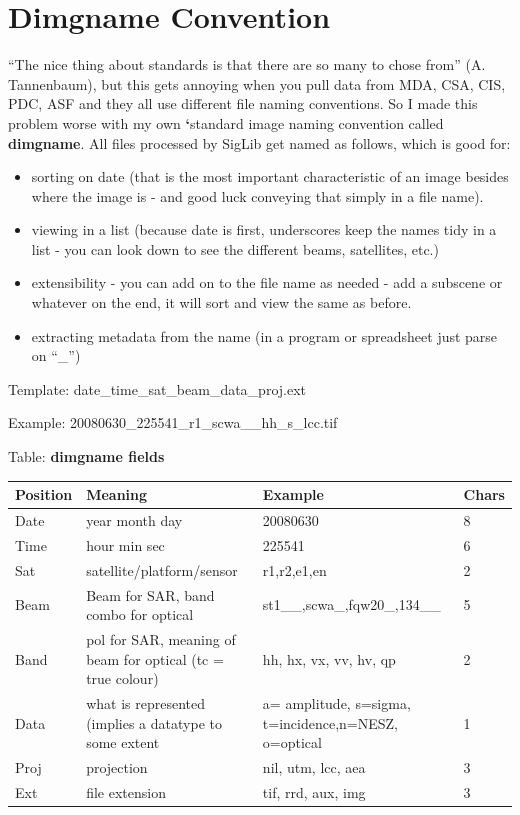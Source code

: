 \documentclass[letterpaper,10pt,openany,oneside]{sphinxmanual}
\begin{document}
\section{Dimgname Convention}
\label{project:dimgname-convention}
“The nice thing about standards is that there are so many to chose from”
(A. Tannenbaum), but this gets annoying when you pull data from MDA,
CSA, CIS, PDC, ASF and they all use different file naming conventions.
So I made this problem worse with my own {\color{red}\bfseries{}{}`}standard image naming
convention called \textbf{dimgname}. All files
processed by SigLib get named as follows, which is good for:
\begin{itemize}
\item {} 
sorting on date (that is the most important characteristic of an
image besides where the image is - and good luck conveying that
simply in a file name).

\item {} 
viewing in a list (because date is first, underscores keep the names
tidy in a list - you can look down to see the different beams,
satellites, etc.)

\item {} 
extensibility - you can add on to the file name as needed - add a
subscene or whatever on the end, it will sort and view the same as
before.

\item {} 
extracting metadata from the name (in a program or spreadsheet just
parse on ``\_'')

\end{itemize}

Template: date\_time\_sat\_beam\_data\_proj.ext

Example: 20080630\_225541\_r1\_scwa\_\_hh\_s\_lcc.tif

Table: \textbf{dimgname fields}

\begin{tabulary}{\linewidth}{|L|L|L|L|}
\hline
\textsf{\relax 
Position
} & \textsf{\relax 
Meaning
} & \textsf{\relax 
Example
} & \textsf{\relax 
Chars
}\\
\hline
\textbar{} Date
 & 
year month day
 & 
20080630
 & 
8
\\
\hline
\textbar{} Time
 & 
hour min sec
 & 
225541
 & 
6
\\
\hline
\textbar{} Sat
 & 
satellite/platform/sensor
 & 
r1,r2,e1,en
 & 
2
\\
\hline
\textbar{} Beam
 & 
Beam for SAR, band combo for optical
 & 
st1\_\_,scwa\_,fqw20\_,134\_\_
 & 
5
\\
\hline
\textbar{} Band
 & 
pol for SAR, meaning of beam for optical (tc = true colour)
 & 
hh, hx, vx, vv, hv, qp
 & 
2
\\
\hline
\textbar{} Data
 & 
what is represented (implies a datatype to some extent
 & 
a= amplitude, s=sigma, t=incidence,n=NESZ, o=optical
 & 
1
\\
\hline
\textbar{} Proj
 & 
projection
 & 
nil, utm, lcc, aea
 & 
3
\\
\hline
\textbar{} Ext
 & 
file extension
 & 
tif, rrd, aux, img
 & 
3
\\
\hline\end{tabulary}
\end{document}

